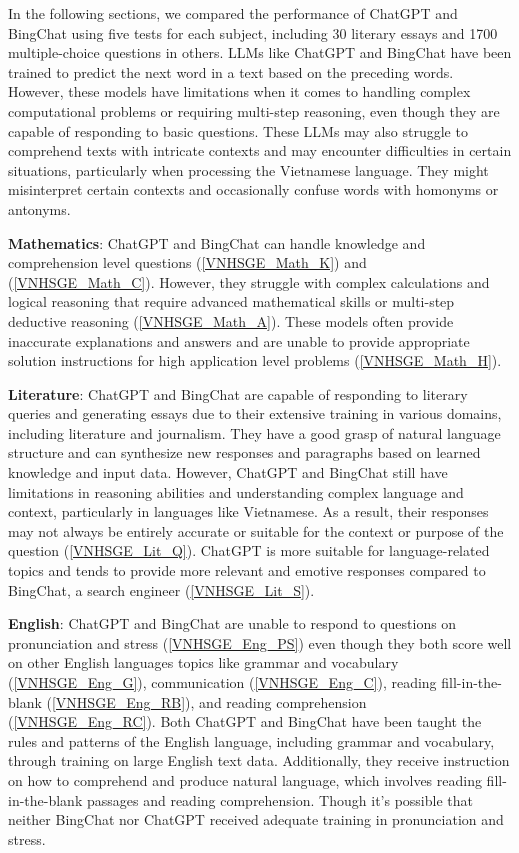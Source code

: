 \documentclass{article}
\begin{document}
{	In the following sections, we compared the performance of ChatGPT and BingChat using five tests for each subject, including 30 literary essays and 1700 multiple-choice questions in others. LLMs like ChatGPT and BingChat have been trained to predict the next word in a text based on the preceding words. 
	However, these models have limitations when it comes to handling complex computational problems or requiring multi-step reasoning, even though they are capable of responding to basic questions. These LLMs may also struggle to comprehend texts with intricate contexts and may encounter difficulties in certain situations, particularly when processing the Vietnamese language. They might misinterpret certain contexts and occasionally confuse words with homonyms or antonyms.
	
	
	\textbf{Mathematics}: ChatGPT and BingChat can handle knowledge and comprehension level questions (\ref{VNHSGE_Math_K}) and (\ref{VNHSGE_Math_C}). However, they struggle with complex calculations and logical reasoning that require advanced mathematical skills or multi-step deductive reasoning (\ref{VNHSGE_Math_A}). These models often provide inaccurate explanations and answers and are unable to provide appropriate solution instructions for high application level problems (\ref{VNHSGE_Math_H}).
	

	
	\textbf{Literature}: ChatGPT and BingChat are capable of responding to literary queries and generating essays due to their extensive training in various domains, including literature and journalism. They have a good grasp of natural language structure and can synthesize new responses and paragraphs based on learned knowledge and input data. However, ChatGPT and BingChat still have limitations in reasoning abilities and understanding complex language and context, particularly in languages like Vietnamese. As a result, their responses may not always be entirely accurate or suitable for the context or purpose of the question (\ref{VNHSGE_Lit_Q}). ChatGPT is more suitable for language-related topics and tends to provide more relevant and emotive responses compared to BingChat, a search engineer (\ref{VNHSGE_Lit_S}).
	

	
	\textbf{English}: ChatGPT and BingChat are unable to respond to questions on pronunciation and stress (\ref{VNHSGE_Eng_PS}) even though they both score well on other English languages topics like grammar and vocabulary (\ref{VNHSGE_Eng_G}), communication (\ref{VNHSGE_Eng_C}), reading fill-in-the-blank (\ref{VNHSGE_Eng_RB}), and reading comprehension (\ref{VNHSGE_Eng_RC}). Both ChatGPT and BingChat have been taught the rules and patterns of the English language, including grammar and vocabulary, through training on large English text data. Additionally, they receive instruction on how to comprehend and produce natural language, which involves reading fill-in-the-blank passages and reading comprehension. Though it's possible that neither BingChat nor ChatGPT received adequate training in pronunciation and stress.
	

}
\end{document}
